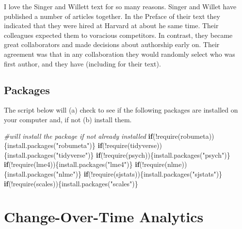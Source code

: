 \documentclass[
  english,
]{book}
\newenvironment{Shaded}{\begin{snugshade}}{\end{snugshade}}
\newcommand{\CommentTok}[1]{\textcolor[rgb]{0.56,0.35,0.01}{\textit{#1}}}
\newcommand{\ControlFlowTok}[1]{\textcolor[rgb]{0.13,0.29,0.53}{\textbf{#1}}}
\newcommand{\FunctionTok}[1]{\textcolor[rgb]{0.00,0.00,0.00}{#1}}
\newcommand{\NormalTok}[1]{#1}
\newcommand{\SpecialCharTok}[1]{\textcolor[rgb]{0.00,0.00,0.00}{#1}}
\newcommand{\StringTok}[1]{\textcolor[rgb]{0.31,0.60,0.02}{#1}}
\begin{document}
I love the Singer and Willett \citeyearpar{singer_applied_2003} text for so many reasons. Singer and Willet have published a number of articles together. In the Preface of their text they indicated that they were hired at Harvard at about he same time. Their colleagues expected them to voracious competitors. In contrast, they became great collaborators and made decisions about authorship early on. Their agreement was that in any collaboration they would randomly select who was first author, and they have (including for their text).

\hypertarget{packages-2}{%
\subsection{Packages}\label{packages-2}}

The script below will (a) check to see if the following packages are installed on your computer and, if not (b) install them.

\begin{Shaded}
\begin{Highlighting}[]
\CommentTok{\#will install the package if not already installed}
\ControlFlowTok{if}\NormalTok{(}\SpecialCharTok{!}\FunctionTok{require}\NormalTok{(robumeta))\{}\FunctionTok{install.packages}\NormalTok{(}\StringTok{"robumeta"}\NormalTok{)\}}
\ControlFlowTok{if}\NormalTok{(}\SpecialCharTok{!}\FunctionTok{require}\NormalTok{(tidyverse))\{}\FunctionTok{install.packages}\NormalTok{(}\StringTok{"tidyverse"}\NormalTok{)\}}
\ControlFlowTok{if}\NormalTok{(}\SpecialCharTok{!}\FunctionTok{require}\NormalTok{(psych))\{}\FunctionTok{install.packages}\NormalTok{(}\StringTok{"psych"}\NormalTok{)\}}
\ControlFlowTok{if}\NormalTok{(}\SpecialCharTok{!}\FunctionTok{require}\NormalTok{(lme4))\{}\FunctionTok{install.packages}\NormalTok{(}\StringTok{"lme4"}\NormalTok{)\}}
\ControlFlowTok{if}\NormalTok{(}\SpecialCharTok{!}\FunctionTok{require}\NormalTok{(nlme))\{}\FunctionTok{install.packages}\NormalTok{(}\StringTok{"nlme"}\NormalTok{)\}}
\ControlFlowTok{if}\NormalTok{(}\SpecialCharTok{!}\FunctionTok{require}\NormalTok{(sjstats))\{}\FunctionTok{install.packages}\NormalTok{(}\StringTok{"sjstats"}\NormalTok{)\}}
\ControlFlowTok{if}\NormalTok{(}\SpecialCharTok{!}\FunctionTok{require}\NormalTok{(scales))\{}\FunctionTok{install.packages}\NormalTok{(}\StringTok{"scales"}\NormalTok{)\}}
\end{Highlighting}
\end{Shaded}

\hypertarget{change-over-time-analytics}{%
\section{Change-Over-Time Analytics}\label{change-over-time-analytics}}
\end{document}

